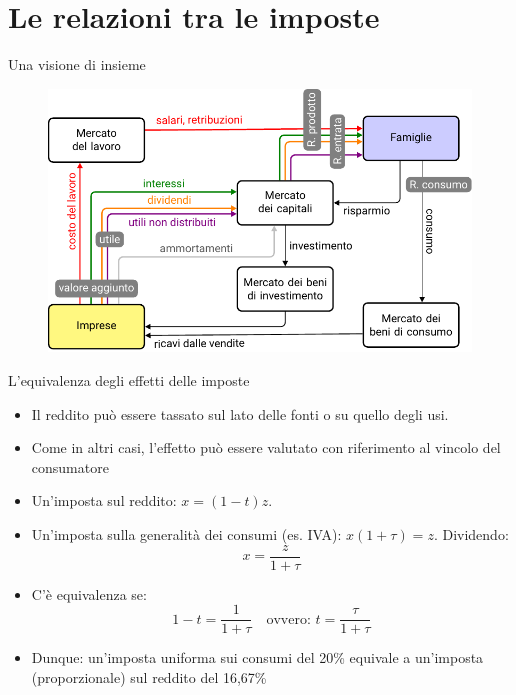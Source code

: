 \documentclass[11pt]{beamer}
\begin{document}
\section{Le relazioni tra le imposte}

\begin{frame}{Una visione di insieme}
\begin{figure}[htbp]
\centering
\includegraphics[width=\textwidth]{./figure/flussi-imposte-1.pdf}
\end{figure}
\end{frame}

\begin{frame}{L'equivalenza degli effetti delle imposte}
\begin{itemize}
\item Il reddito può essere tassato sul lato delle fonti o su quello degli usi.
\item Come in altri casi, l'effetto può essere valutato con riferimento al vincolo
del consumatore
\item Un'imposta sul reddito: $x=(1-t)z$.
\item Un'imposta sulla generalità dei consumi (es. IVA): $x(1+\tau)=z$.
Dividendo:
\begin{equation*}
   x = \frac{z}{1+\tau}
\end{equation*}
\item C'è equivalenza se:
\begin{equation*}
   1-t = \frac{1}{1+\tau} \quad\text{ovvero: }t = \frac{\tau}{1+\tau}
\end{equation*}
\item Dunque: un'imposta uniforma sui consumi del 20\% equivale a un'imposta
(proporzionale) sul reddito del 16,67\%
\end{itemize}
\end{frame}
\end{document}
